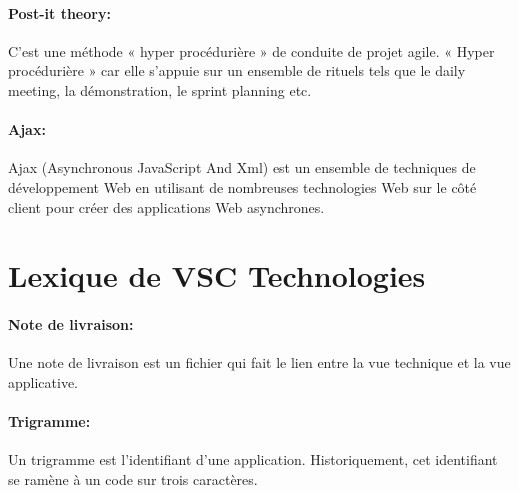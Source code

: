 \paragraph{Post-it theory: }
\label{lexi:post_it_theory}
C’est une méthode « hyper procédurière » de conduite de projet agile.
« Hyper procédurière » car elle s’appuie sur un ensemble de rituels tels que le daily meeting, la démonstration, le sprint planning etc.

\paragraph{Ajax: }
\label{lexi:ajax}
Ajax (Asynchronous JavaScript And Xml) est un ensemble de techniques de développement Web en utilisant de nombreuses technologies Web sur le côté client pour créer des applications Web asynchrones.

\section{Lexique de VSC Technologies}

\paragraph{Note de livraison: }
\label{lexi:delivery_note}
Une note de livraison est un fichier qui fait le lien entre la vue technique et la vue applicative.

\paragraph{Trigramme: }
\label{lexi:trigramme}
Un trigramme est l'identifiant d'une application.
Historiquement, cet identifiant se ramène à un code sur trois caractères.
